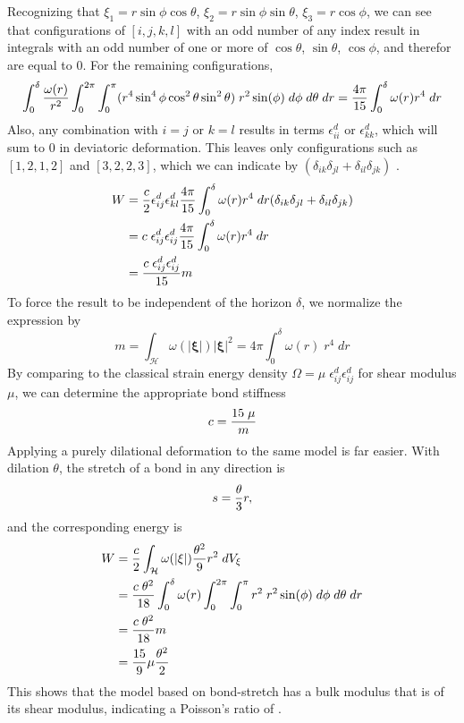 %
Recognizing that $\xi_1 = r \sin\phi\cos\theta$, $\xi_2=r\sin\phi\sin\theta$, $\xi_3=r\cos\phi$, we can see that configurations of $[i,j,k,l]$ with an odd number of any index result in integrals with an odd number of one or more of $\cos\theta$, $\sin\theta$, $\cos\phi$, and therefor are equal to 0. 
For the remaining configurations,
%
\begin{equation}
\int_0^\delta \frac{\omega(r)}{r^2}\int_0^{2\pi}\int_0^\pi (r^4 \sin^4 \phi \cos^2\theta\sin^2\theta)\;r^2 \sin(\phi)\;d\phi\;d\theta\;dr =  \frac{4\pi}{15} \int_0^\delta \omega(r)r^4\;dr\notag
\end{equation}
%
Also, any combination with $i=j$ or $k=l$ results in terms $\epsilon_{ii}^d$ or  $\epsilon_{kk}^d$, which will sum to 0 in deviatoric deformation. 
This leaves only configurations such as $[1,2,1,2]$ and $[3,2,2,3]$, which we can indicate by $(\delta_{ik}\delta_{jl}+\delta_{il}\delta_{jk})$ .
%
\begin{align}
W&= \frac{c}{2}\epsilon_{ij}^d \epsilon_{kl}^d \frac{4\pi}{15} \int_0^\delta \omega(r)r^4\;dr (\delta_{ik}\delta_{jl}+\delta_{il}\delta_{jk})\notag\\
&= c \;\epsilon_{ij}^d\epsilon_{ij}^d \frac{4\pi}{15} \int_0^\delta \omega(r)r^4\;dr \notag\\
&= \frac{c\; \epsilon_{ij}^d\epsilon_{ij}^d }{15}m\notag
\end{align}
%
To force the result to be independent of the horizon $\delta$, we normalize the expression by
%
\begin{equation}
\label{eq:weighted}
m=\int_\mathcal{H}\omega(|\boldsymbol{\xi}|)|\boldsymbol{\xi}|^2 = 4\pi \int_0^\delta \omega(r)\;r^4\;dr
\end{equation}
%
By comparing to the classical strain energy density $\Omega = \mu\;\epsilon_{ij}^d\epsilon_{ij}^d$ for shear modulus $\mu$, we can determine the appropriate bond stiffness
%
\begin{equation}
c = \frac{15\;\mu}{m}\notag
\end{equation}
%
Applying a purely dilational deformation to the same model is far easier.
With dilation $\theta$, the stretch of a bond in any direction is
%
\begin{equation}
s = \frac{\theta}{3} r,\notag
\end{equation}
%
and the corresponding energy is 
%
\begin{align}
W &= \frac{c}{2}\int_\mathcal{H} \omega(|\xi|)\frac{\theta^2}{9} r^2 \;dV_\xi\notag\\
&=\frac{c\;\theta^2}{18} \int_0^\delta \omega(r)\int_0^{2\pi}\int_0^\pi r^2\;r^2 \sin(\phi)\;d\phi\;d\theta\;dr \notag\\
&= \frac{c\;\theta^2}{18} m \notag\\
&= \frac{15}{9}\mu\frac{\theta^2}{2}
\end{align}
%
This shows that the model based on bond-stretch has a bulk modulus that is  of its shear modulus, indicating a Poisson's ratio of .

